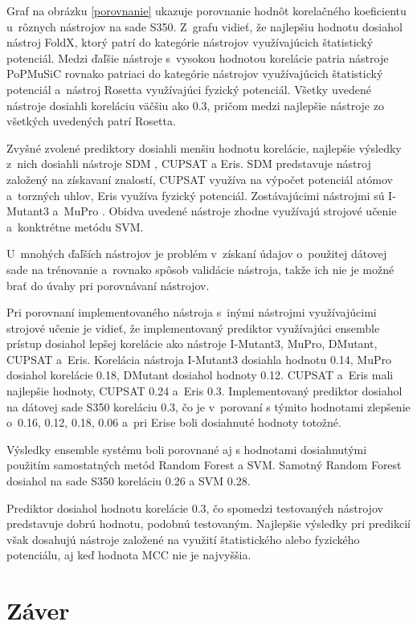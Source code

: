 Graf na obrázku \ref{porovnanie} ukazuje porovnanie hodnôt korelačného koeficientu u~rôznych nástrojov na sade S350. Z~grafu vidieť, že najlepšiu hodnotu dosiahol nástroj FoldX, ktorý patrí do kategórie nástrojov využívajúcich štatistický potenciál. Medzi ďaľšie nástroje s~vysokou hodnotou korelácie patria nástroje PoPMuSiC rovnako patriaci do kategórie nástrojov využívajúcich štatistický potenciál a~nástroj Rosetta využívajúci fyzický potenciál. Všetky uvedené nástroje dosiahli koreláciu väčšiu ako 0.3, pričom medzi najlepšie nástroje zo všetkých uvedených patrí Rosetta.

Zvyšné zvolené prediktory dosiahli menšiu hodnotu korelácie, najlepšie výsledky z~nich dosiahli nástroje SDM \cite{sdm}, CUPSAT a Eris. SDM predstavuje nástroj založený na získavaní znalostí, CUPSAT využíva na výpočet potenciál atómov a~torzných uhlov, Eris využíva fyzický potenciál. Zostávajúcimi nástrojmi sú I-Mutant3 a~MuPro \cite{mupro}. Obidva uvedené nástroje zhodne využívajú strojové učenie a~konktrétne metódu SVM.
 
U~mnohých ďaľších nástrojov je problém v~získaní údajov o~použitej dátovej sade na trénovanie a~rovnako spôsob validácie nástroja, takže ich nie je možné brať do úvahy pri porovnávaní nástrojov.

Pri porovnaní implementovaného nástroja s~inými nástrojmi využívajúcimi strojové učenie je vidieť, že implementovaný prediktor využívajúci ensemble prístup dosiahol lepšej korelácie ako nástroje I-Mutant3, MuPro, DMutant, CUPSAT a~Eris. Korelácia nástroja I-Mutant3 dosiahla hodnotu 0.14, MuPro dosiahol korelácie 0.18, DMutant dosiahol hodnoty 0.12. CUPSAT a~Eris mali najlepšie hodnoty, CUPSAT 0.24 a~Eris 0.3. Implementovaný prediktor dosiahol na dátovej sade S350 koreláciu 0.3, čo je v~porovaní s týmito hodnotami zlepšenie o~0.16, 0.12, 0.18, 0.06 a~pri Erise boli dosiahnuté hodnoty totožné.

Výsledky ensemble systému boli porovnané aj s hodnotami dosiahnutými použitím samostatných metód Random Forest a SVM. Samotný Random Forest dosiahol na sade S350 koreláciu 0.26 a SVM 0.28.

Prediktor dosiahol hodnotu korelácie 0.3, čo spomedzi testovaných nástrojov predstavuje dobrú hodnotu, podobnú testovaným. Najlepšie výsledky pri predikcií však dosahujú nástroje založené na využití štatistického alebo fyzického potenciálu, aj keď hodnota MCC nie je najvyššia.

\chapter{Záver}

